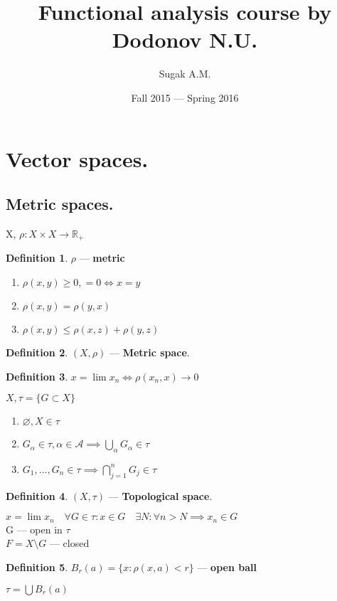 \documentclass[12pt, fleqn]{article}
\author{Sugak A.M.}
\title{Functional analysis course by Dodonov N.U.}
\date{Fall 2015 --- Spring 2016}
\theoremstyle{definition}
\newtheorem*{defn}{Definition}
\theoremstyle{break}
\theoremstyle{theorem}
\begin{document}
\maketitle
\newpage
\section{Vector spaces.}
\subsection{Metric spaces.}

X, $\rho\colon X \times X \to \mathbb{R}_+$
\begin{defn}$\rho$ --- \textbf{metric}\end{defn}
  \begin{enumerate} 
    \item $\rho(x, y) \geq 0, = 0 \iff x = y$
    \item $\rho(x, y) = \rho (y, x)$
    \item $\rho(x, y) \leq \rho (x, z) + \rho (y, z)$
  \end{enumerate}
\begin{defn}$(X, \rho)$ --- \textbf{Metric space}.\end{defn}
\begin{defn}$x = \lim x_{n} \iff \rho(x_{n}, x) \rightarrow 0$\end{defn}
\vspace{5mm}
$X, \tau = \{G \subset X\}$
\begin{enumerate}
  \item $\varnothing, X \in \tau$
  \item $G_\alpha \in \tau, \alpha \in \mathcal{A} \implies \bigcup\limits_\alpha G_\alpha \in \tau$
  \item $G_1, \dotsc, G_n \in \tau \implies \bigcap\limits_{j = 1}^n G_j \in \tau$
\end{enumerate}
\begin{defn}$(X, \tau)$ --- \textbf{Topological space}.\end{defn}
$x = \lim x_n \quad \forall G \in \tau: x \in G \quad \exists N: \forall n > N \implies x_n \in G$
\\G --- open in $\tau$
\\$F = X \setminus G$ --- closed
\begin{defn}
  $B_r (a) = \{x: \rho(x, a) < r\}$ --- \textbf{open ball}
\end{defn}
\noindent
$\tau = \bigcup B_r (a)$
\vspace{5mm}
\end{document}
